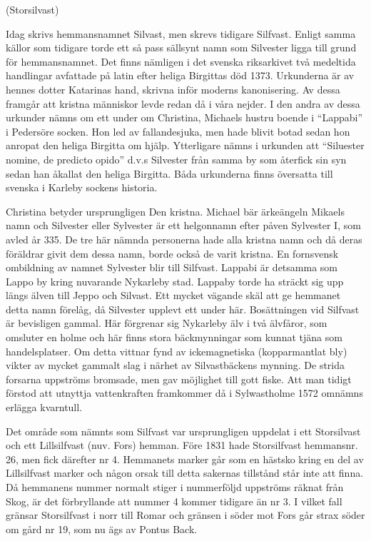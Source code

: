 
  (Storsilvast)

Idag skrivs hemmansnamnet Silvast, men skrevs tidigare Silfvast. Enligt samma källor som tidigare torde ett så pass sällsynt namn som Silvester ligga till grund för hemmansnamnet. Det finns nämligen i det svenska riksarkivet två medeltida handlingar avfattade på latin efter heliga Birgittas död 1373. Urkunderna är av hennes dotter Katarinas hand, skrivna inför moderns kanonisering. Av dessa framgår att kristna människor levde redan då i våra nejder. I den andra av dessa urkunder nämns om ett under om Christina, Michaels hustru boende i ``Lappabi'' i Pedersöre socken. Hon led av fallandesjuka, men hade blivit botad sedan hon anropat den heliga Birgitta om hjälp. Ytterligare nämns i urkunden att ``Siluester nomine, de predicto opido'' d.v.s Silvester från samma by som återfick sin syn sedan han åkallat den heliga Birgitta. Båda urkunderna finns översatta till svenska i Karleby sockens historia.

Christina betyder ursprungligen Den kristna. Michael bär ärkeängeln Mikaels namn och Silvester eller Sylvester är ett helgonnamn efter påven Sylvester I, som avled år 335. De tre här nämnda personerna hade alla kristna namn och då deras föräldrar givit dem dessa namn, borde också de varit kristna. En fornsvensk ombildning av namnet Sylvester blir till Silfvast. Lappabi är detsamma som Lappo by kring nuvarande Nykarleby stad. Lappaby torde ha sträckt sig upp längs älven till Jeppo och Silvast. Ett mycket vägande skäl att ge hemmanet detta namn förelåg, då Silvester upplevt ett under här. Bosättningen vid Silfvast är bevisligen gammal. Här förgrenar sig Nykarleby älv i två älvfåror, som omsluter en holme och här finns stora bäckmynningar som kunnat tjäna som handelsplatser. Om detta vittnar fynd av ickemagnetiska (kopparmantlat bly) vikter av mycket gammalt slag i närhet av Silvastbäckens mynning. De strida forsarna uppströms bromsade, men gav möjlighet till gott fiske. Att man tidigt förstod att utnyttja vattenkraften framkommer då  i Sylwastholme 1572 omnämns erlägga kvarntull.

Det område som nämnts som Silfvast var ursprungligen uppdelat i ett Storsilvast och ett Lillsilfvast (nuv. Fors) hemman. Före 1831 hade Storsilfvast hemmansnr. 26, men fick därefter nr 4. Hemmanets marker går som en hästsko kring en del av Lillsilfvast marker och någon orsak till detta sakernas tillstånd står inte att finna. Då hemmanens nummer normalt stiger i nummerföljd uppströms räknat från Skog, är det förbryllande att nummer 4 kommer tidigare än nr 3. I vilket fall gränsar Storsilfvast i norr till Romar och gränsen i söder mot Fors går strax söder om gård nr 19, som nu ägs av Pontus Back.

